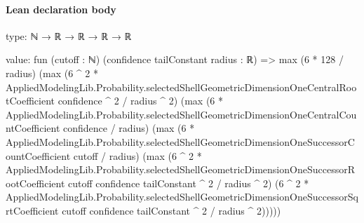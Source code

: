 \documentclass[10pt]{article}
\begin{document}
\paragraph{Lean declaration body}
\begin{ReviewVerbatim}
type:
ℕ → ℝ → ℝ → ℝ → ℝ

value:
fun (cutoff : ℕ) (confidence tailConstant radius : ℝ) =>
  max (6 * 128 / radius)
    (max
      (6 ^ 2 * AppliedModelingLib.Probability.selectedShellGeometricDimensionOneCentralRootCoefficient confidence ^ 2 /
        radius ^ 2)
      (max
        (6 * AppliedModelingLib.Probability.selectedShellGeometricDimensionOneCentralCountCoefficient confidence /
          radius)
        (max
          (6 * AppliedModelingLib.Probability.selectedShellGeometricDimensionOneSuccessorCountCoefficient cutoff /
            radius)
          (max
            (6 ^ 2 *
                AppliedModelingLib.Probability.selectedShellGeometricDimensionOneSuccessorRootCoefficient cutoff
                    confidence tailConstant ^
                  2 /
              radius ^ 2)
            (6 ^ 2 *
                AppliedModelingLib.Probability.selectedShellGeometricDimensionOneSuccessorSqrtCoefficient cutoff
                    confidence tailConstant ^
                  2 /
              radius ^ 2)))))
\end{ReviewVerbatim}
\end{document}
